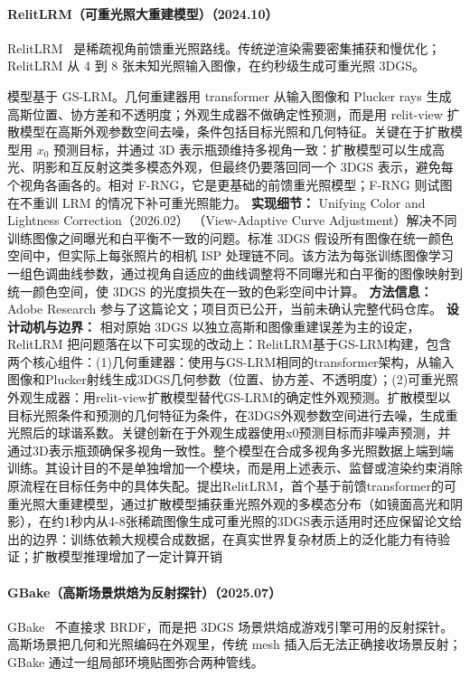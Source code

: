 \paragraph{RelitLRM（可重光照大重建模型）（2024.10）}
RelitLRM~\cite{2410_06231} 是稀疏视角前馈重光照路线。传统逆渲染需要密集捕获和慢优化；RelitLRM 从 4 到 8 张未知光照输入图像，在约秒级生成可重光照 3DGS。

模型基于 GS-LRM。几何重建器用 transformer 从输入图像和 Plucker rays 生成高斯位置、协方差和不透明度；外观生成器不做确定性预测，而是用 relit-view 扩散模型在高斯外观参数空间去噪，条件包括目标光照和几何特征。关键在于扩散模型用 $x_0$ 预测目标，并通过 3D 表示瓶颈维持多视角一致：扩散模型可以生成高光、阴影和互反射这类多模态外观，但最终仍要落回同一个 3DGS 表示，避免每个视角各画各的。相对 F-RNG，它是更基础的前馈重光照模型；F-RNG 则试图在不重训 LRM 的情况下补可重光照能力。
\textbf{实现细节：} Unifying Color and Lightness Correction（2026.02） （View-Adaptive Curve Adjustment）解决不同训练图像之间曝光和白平衡不一致的问题。标准 3DGS 假设所有图像在统一颜色空间中，但实际上每张照片的相机 ISP 处理链不同。该方法为每张训练图像学习一组色调曲线参数，通过视角自适应的曲线调整将不同曝光和白平衡的图像映射到统一颜色空间，使 3DGS 的光度损失在一致的色彩空间中计算。
\textbf{方法信息：} Adobe Research 参与了这篇论文；项目页已公开，当前未确认完整代码仓库。
\textbf{设计动机与边界：} 相对原始 3DGS 以独立高斯和图像重建误差为主的设定，RelitLRM 把问题落在以下可实现的改动上：RelitLRM基于GS-LRM构建，包含两个核心组件：(1)几何重建器：使用与GS-LRM相同的transformer架构，从输入图像和Plucker射线生成3DGS几何参数（位置、协方差、不透明度）；(2)可重光照外观生成器：用relit-view扩散模型替代GS-LRM的确定性外观预测。扩散模型以目标光照条件和预测的几何特征为条件，在3DGS外观参数空间进行去噪，生成重光照后的球谐系数。关键创新在于外观生成器使用x0预测目标而非噪声预测，并通过3D表示瓶颈确保多视角一致性。整个模型在合成多视角多光照数据上端到端训练。其设计目的不是单独增加一个模块，而是用上述表示、监督或渲染约束消除原流程在目标任务中的具体失配。提出RelitLRM，首个基于前馈transformer的可重光照大重建模型，通过扩散模型捕获重光照外观的多模态分布（如镜面高光和阴影），在约1秒内从4-8张稀疏图像生成可重光照的3DGS表示适用时还应保留论文给出的边界：训练依赖大规模合成数据，在真实世界复杂材质上的泛化能力有待验证；扩散模型推理增加了一定计算开销
\paragraph{GBake（高斯场景烘焙为反射探针）（2025.07）}
GBake~\cite{2507_02257} 不直接求 BRDF，而是把 3DGS 场景烘焙成游戏引擎可用的反射探针。高斯场景把几何和光照编码在外观里，传统 mesh 插入后无法正确接收场景反射；GBake 通过一组局部环境贴图弥合两种管线。

